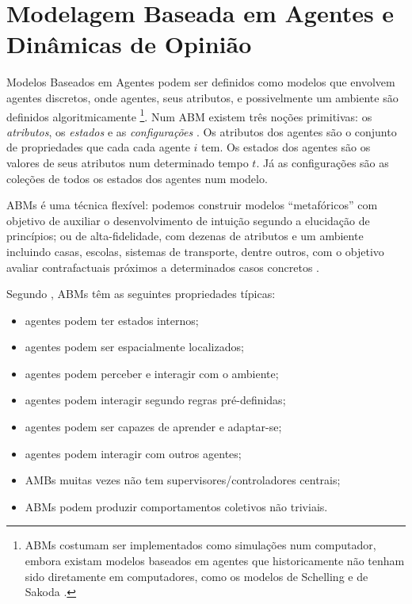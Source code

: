 \section{Modelagem Baseada em Agentes e Dinâmicas de Opinião}

Modelos Baseados em Agentes podem ser definidos como modelos que envolvem
agentes discretos, onde agentes, seus atributos, e possivelmente um ambiente são
definidos algoritmicamente \cite{sayama2015introduction} \footnote{ ABMs
  costumam ser implementados como simulações num computador, embora existam
  modelos baseados em agentes que historicamente não tenham sido diretamente em
  computadores, como os modelos de Schelling e de Sakoda
  \cite{hegselmann2017thomas}.}. Num ABM existem três noções primitivas: os
\textit{atributos}, os \textit{estados} e as \textit{configurações}
\cite[p.7]{de2014agent}. Os atributos dos agentes são o conjunto de propriedades
que cada cada agente \(i\) tem. Os estados dos agentes são os valores de seus
atributos num determinado tempo \(t\). Já as configurações são as coleções de
todos os estados dos agentes num modelo.

ABMs é uma técnica flexível: podemos construir modelos ``metafóricos'' com
objetivo de auxiliar o desenvolvimento de intuição segundo a elucidação de
princípios; ou de alta-fidelidade, com dezenas de atributos e um
ambiente incluindo casas, escolas, sistemas de transporte, dentre outros, com o
objetivo avaliar contrafactuais próximos a determinados casos concretos
\cite{de2014agent, epstein2006generative}.


Segundo , ABMs têm as seguintes
propriedades típicas:
\begin{itemize}
\item agentes podem ter estados internos;
\item agentes podem ser espacialmente localizados;
\item agentes podem perceber e interagir com o ambiente;
\item agentes podem interagir segundo regras pré-definidas;
\item agentes podem ser capazes de aprender e adaptar-se;
\item agentes podem interagir com outros agentes;
\item AMBs muitas vezes não tem supervisores/controladores centrais;
  \item ABMs podem produzir comportamentos coletivos não triviais.
  \end{itemize}

